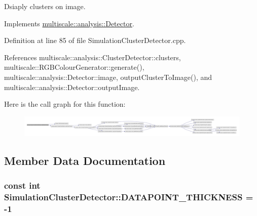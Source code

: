 \-Dsiaply clusters on image. 



\-Implements \hyperlink{classmultiscale_1_1analysis_1_1Detector_a5d10b68605d5a1711527b4b896b3b2cc}{multiscale\-::analysis\-::\-Detector}.



\-Definition at line 85 of file \-Simulation\-Cluster\-Detector.\-cpp.



\-References multiscale\-::analysis\-::\-Cluster\-Detector\-::clusters, multiscale\-::\-R\-G\-B\-Colour\-Generator\-::generate(), multiscale\-::analysis\-::\-Detector\-::image, output\-Cluster\-To\-Image(), and multiscale\-::analysis\-::\-Detector\-::output\-Image.



\-Here is the call graph for this function\-:\nopagebreak
\begin{figure}[H]
\begin{center}
\leavevmode
\includegraphics[width=350pt]{classmultiscale_1_1analysis_1_1SimulationClusterDetector_a909e1e53836f1688ebe312c5f7fb70b5_cgraph}
\end{center}
\end{figure}




\subsection{\-Member \-Data \-Documentation}
\hypertarget{classmultiscale_1_1analysis_1_1SimulationClusterDetector_a530922a3fad1e612062d17d07e2dc763}{
\subsubsection[{\-D\-A\-T\-A\-P\-O\-I\-N\-T\-\_\-\-T\-H\-I\-C\-K\-N\-E\-S\-S}]{\setlength{\rightskip}{0pt plus 5cm}const int {\bf \-Simulation\-Cluster\-Detector\-::\-D\-A\-T\-A\-P\-O\-I\-N\-T\-\_\-\-T\-H\-I\-C\-K\-N\-E\-S\-S} = -\/1}}\label{classmultiscale_1_1analysis_1_1SimulationClusterDetector_a530922a3fad1e612062d17d07e2dc763}


